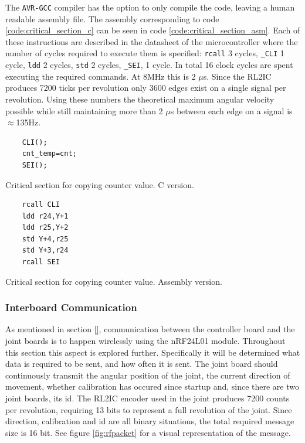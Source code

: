 The \texttt{AVR-GCC} compiler has the option to only compile the code, leaving a human readable assembly file.
The assembly corresponding to code \ref{code:critical_section_c} can be seen in code \ref{code:critical_section_asm}.
Each of these instructions are described in the datasheet of the microcontroller where the number of cycles required to execute them is specified: \texttt{rcall} 3 cycles, \texttt{\_CLI} 1 cycle, \texttt{ldd} 2 cycles, \texttt{std} 2 cycles, \texttt{\_SEI}, 1 cycle.
In total 16 clock cycles are spent executing the required commands.
At 8MHz this is 2 $\mu$s.
Since the RL2IC produces 7200 ticks per revolution only 3600 edges exist on a single signal per revolution. 
Using these numbers the theoretical maximum angular velocity possible while still maintaining more than 2 $\mu$s between each edge on a signal is $\approx$135Hz.

\begin{listing}[h]
\begin{verbatim}
	CLI();
	cnt_temp=cnt;
	SEI();
\end{verbatim}
\caption{Critical section for copying counter value. C version.}
\label{code:critical_section_c}
\end{listing}

\begin{listing}[h]
\begin{verbatim}
	rcall CLI
	ldd r24,Y+1
	ldd r25,Y+2
	std Y+4,r25
	std Y+3,r24
	rcall SEI
\end{verbatim}
\caption{Critical section for copying counter value. Assembly version.}
\label{code:critical_section_asm}
\end{listing}

\subsubsection{Interboard Communication} %
\label{ssub:interboard_communication}
As mentioned in section \ref{}, communication between the controller board and the joint boards is to happen wirelessly using the nRF24L01 module.
Throughout this section this aspect is explored further.
Specifically it will be determined what data is required to be sent, and how often it is sent.
The joint board should continuously transmit the angular position of the joint, the current direction of movement, whether calibration has occured since startup and, since there are two joint boards, its id.
The RL2IC encoder used in the joint produces 7200 counts per revolution, requiring 13 bits to represent a full revolution of the joint.
Since direction, calibration and id are all binary situations, the total required message size is 16 bit.
See figure \ref{fig:rfpacket} for a visual representation of the message.

